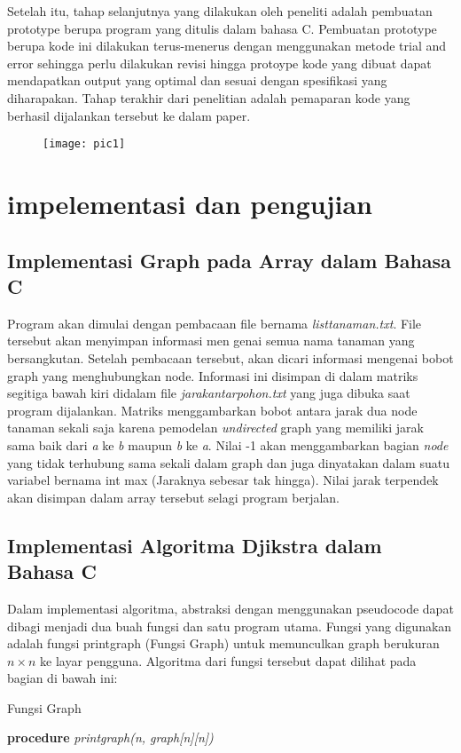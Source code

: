 \documentclass[conference]{IEEEtran}
\begin{document}
	Setelah itu, tahap selanjutnya yang dilakukan oleh peneliti adalah pembuatan prototype berupa program yang ditulis dalam bahasa C. Pembuatan prototype berupa kode ini dilakukan terus-menerus dengan menggunakan metode trial and error sehingga perlu dilakukan revisi hingga protoype kode yang dibuat dapat mendapatkan output yang optimal dan sesuai dengan spesifikasi yang diharapakan. Tahap terakhir dari penelitian adalah pemaparan kode yang berhasil dijalankan tersebut ke dalam paper.
\begin{figure}[htbp]
\texttt{[image: pic1]}
\end{figure}
\newpage
\section{impelementasi dan pengujian}

\subsection{Implementasi Graph pada Array dalam Bahasa C}

Program akan dimulai dengan pembacaan file bernama \textit {listtanaman.txt}. File tersebut akan menyimpan informasi men genai semua nama tanaman yang bersangkutan. Setelah pembacaan tersebut, akan dicari informasi mengenai bobot graph yang menghubungkan node. Informasi ini disimpan di dalam matriks segitiga bawah kiri didalam file \textit {jarakantarpohon.txt} yang juga dibuka saat program dijalankan. Matriks menggambarkan bobot antara jarak dua node tanaman sekali saja karena pemodelan \textit {undirected} graph yang memiliki jarak sama baik dari \textit a ke \textit b maupun \textit b ke \textit a. Nilai -1 akan menggambarkan bagian \textit {node} yang tidak terhubung sama sekali dalam graph dan juga dinyatakan dalam suatu variabel bernama int max (Jaraknya sebesar tak hingga). Nilai jarak terpendek akan disimpan dalam array tersebut selagi program berjalan.
\subsection{Implementasi Algoritma Djikstra dalam Bahasa C}
	Dalam implementasi algoritma, abstraksi dengan menggunakan pseudocode dapat dibagi menjadi dua buah fungsi dan satu program utama. Fungsi yang digunakan adalah fungsi printgraph (Fungsi Graph) untuk memunculkan graph berukuran $n \times n$ ke layar pengguna. Algoritma dari fungsi tersebut dapat dilihat pada bagian di bawah ini:
\begin{algorithm}
\caption{Fungsi Graph }\label{alg:two}
\textbf{procedure} \textit{printgraph(n, graph[n][n])}
\newline
{}
\end{algorithm}
	
\end{document}
